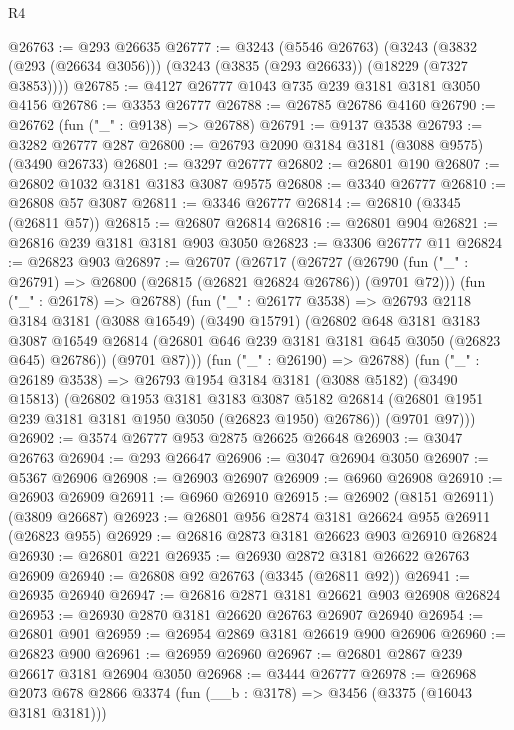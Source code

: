 \begin{lexlean}{R4}
\begin{coremodule}
@26763 := @293 @26635
@26777 := @3243
    (@5546 @26763)
    (@3243 (@3832 (@293 (@26634 @3056))) (@3243 (@3835 (@293 @26633)) (@18229 (@7327 @3853))))
@26785 := @4127 @26777 @1043 @735 @239 @3181 @3181 @3050 @4156
@26786 := @3353 @26777
@26788 := @26785 @26786 @4160
@26790 := @26762 (fun ("_" : @9138) => @26788)
@26791 := @9137 @3538
@26793 := @3282 @26777 @287
@26800 := @26793 @2090 @3184 @3181 (@3088 @9575) (@3490 @26733)
@26801 := @3297 @26777
@26802 := @26801 @190
@26807 := @26802 @1032 @3181 @3183 @3087 @9575
@26808 := @3340 @26777
@26810 := @26808 @57 @3087
@26811 := @3346 @26777
@26814 := @26810 (@3345 (@26811 @57))
@26815 := @26807 @26814
@26816 := @26801 @904
@26821 := @26816 @239 @3181 @3181 @903 @3050
@26823 := @3306 @26777 @11
@26824 := @26823 @903
@26897 := @26707
    (@26717
      (@26727
        (@26790 (fun ("_" : @26791) => @26800 (@26815 (@26821 @26824 @26786)) (@9701 @72)))
        (fun ("_" : @26178) => @26788)
        (fun ("_" : @26177 @3538) =>
        @26793
          @2118
          @3184
          @3181
          (@3088 @16549)
          (@3490 @15791)
          (@26802
            @648
            @3181
            @3183
            @3087
            @16549
            @26814
            (@26801 @646 @239 @3181 @3181 @645 @3050 (@26823 @645) @26786))
          (@9701 @87)))
      (fun ("_" : @26190) => @26788)
      (fun ("_" : @26189 @3538) =>
      @26793
        @1954
        @3184
        @3181
        (@3088 @5182)
        (@3490 @15813)
        (@26802
          @1953
          @3181
          @3183
          @3087
          @5182
          @26814
          (@26801 @1951 @239 @3181 @3181 @1950 @3050 (@26823 @1950) @26786))
        (@9701 @97)))
@26902 := @3574 @26777 @953 @2875 @26625 @26648
@26903 := @3047 @26763
@26904 := @293 @26647
@26906 := @3047 @26904 @3050
@26907 := @5367 @26906
@26908 := @26903 @26907
@26909 := @6960 @26908
@26910 := @26903 @26909
@26911 := @6960 @26910
@26915 := @26902 (@8151 @26911) (@3809 @26687)
@26923 := @26801 @956 @2874 @3181 @26624 @955 @26911 (@26823 @955)
@26929 := @26816 @2873 @3181 @26623 @903 @26910 @26824
@26930 := @26801 @221
@26935 := @26930 @2872 @3181 @26622 @26763 @26909
@26940 := @26808 @92 @26763 (@3345 (@26811 @92))
@26941 := @26935 @26940
@26947 := @26816 @2871 @3181 @26621 @903 @26908 @26824
@26953 := @26930 @2870 @3181 @26620 @26763 @26907 @26940
@26954 := @26801 @901
@26959 := @26954 @2869 @3181 @26619 @900 @26906
@26960 := @26823 @900
@26961 := @26959 @26960
@26967 := @26801 @2867 @239 @26617 @3181 @26904 @3050
@26968 := @3444 @26777
@26978 := @26968 @2073 @678 @2866 @3374 (fun (__b : @3178) => @3456 (@3375 (@16043 @3181 @3181)))

\end{coremodule}
\end{lexlean}
